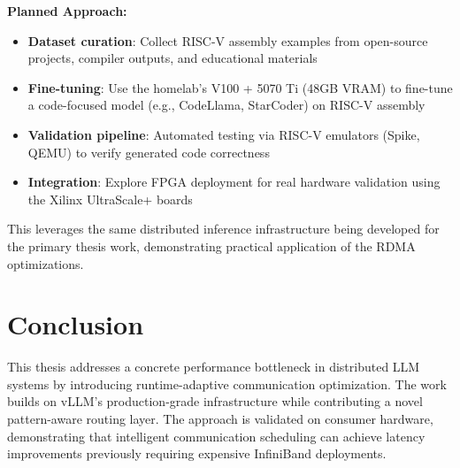 \documentclass[10pt,letterpaper]{article}
\begin{document}
\textbf{Planned Approach:}
\begin{itemize}[noitemsep]
    \item \textbf{Dataset curation}: Collect RISC-V assembly examples from open-source projects, compiler outputs, and educational materials
    \item \textbf{Fine-tuning}: Use the homelab's V100 + 5070 Ti (48GB VRAM) to fine-tune a code-focused model (e.g., CodeLlama, StarCoder) on RISC-V assembly
    \item \textbf{Validation pipeline}: Automated testing via RISC-V emulators (Spike, QEMU) to verify generated code correctness
    \item \textbf{Integration}: Explore FPGA deployment for real hardware validation using the Xilinx UltraScale+ boards
\end{itemize}

This leverages the same distributed inference infrastructure being developed for the primary thesis work, demonstrating practical application of the RDMA optimizations.

\section{Conclusion}

This thesis addresses a concrete performance bottleneck in distributed LLM systems by introducing runtime-adaptive communication optimization. The work builds on vLLM's production-grade infrastructure while contributing a novel pattern-aware routing layer. The approach is validated on consumer hardware, demonstrating that intelligent communication scheduling can achieve latency improvements previously requiring expensive InfiniBand deployments.
\end{document}
